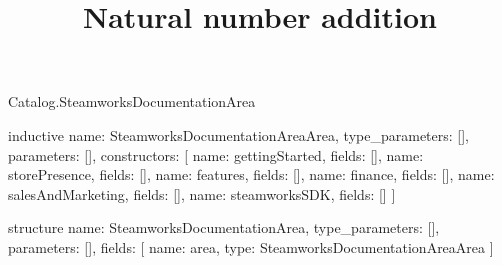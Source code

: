 \begin{lexlean}{Catalog.SteamworksDocumentationArea}
\title{Natural number addition}
\begin{semanticmodule}
inductive{
  name: SteamworksDocumentationAreaArea,
  type_parameters: [],
  parameters: [],
  constructors: [
    {name: gettingStarted, fields: []},
    {name: storePresence, fields: []},
    {name: features, fields: []},
    {name: finance, fields: []},
    {name: salesAndMarketing, fields: []},
    {name: steamworksSDK, fields: []}
  ]
}

structure{
  name: SteamworksDocumentationArea,
  type_parameters: [],
  parameters: [],
  fields: [
    {name: area, type: SteamworksDocumentationAreaArea}
  ]
}
\end{semanticmodule}
\end{lexlean}
